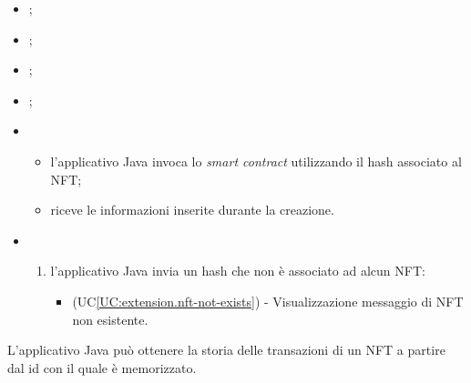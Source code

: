 \begin{itemize}
  \item {};
  \item {};
  \item {};
  \item {};
  
  \item \UCMain
  \begin{itemize}
    \item l'applicativo Java invoca lo \textit{smart contract} utilizzando il hash associato al NFT;
    \item riceve le informazioni inserite durante la creazione. 
  \end{itemize}
  
  \item \UCExt
  \begin{enumerate}[label=\lett]
    \item l'applicativo Java invia un hash che non è associato ad alcun NFT:
    \begin{itemize}
      \item (UC\ref{UC:extension.nft-not-exists}) - Visualizzazione messaggio di NFT non esistente.
    \end{itemize}
  \end{enumerate}
\end{itemize}

\label{UC:get-transaction-history}

L'applicativo Java può ottenere la storia delle transazioni di un NFT a partire dal id con il quale è memorizzato.

